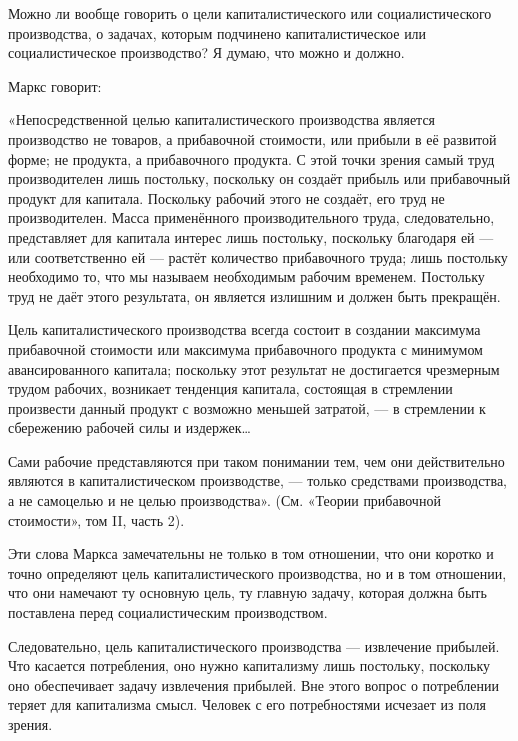 \documentclass[12pt, a4paper, openany]{book}
\begin{document}
Можно ли вообще говорить о цели капиталистического или социалистического производства, о задачах, которым подчинено капиталистическое или социалистическое производство? Я думаю, что можно и должно.



Маркс говорит:



«Непосредственной целью капиталистического производства является производство не товаров, а прибавочной стоимости, или прибыли в её развитой форме; не продукта, а прибавочного продукта. С этой точки зрения самый труд производителен лишь постольку, поскольку он создаёт прибыль или прибавочный продукт для капитала. Поскольку рабочий этого не создаёт, его труд не производителен. Масса применённого производительного труда, следовательно, представляет для капитала интерес лишь постольку, поскольку благодаря ей — или соответственно ей — растёт количество прибавочного труда; лишь постольку необходимо то, что мы называем необходимым рабочим временем. Постольку труд не даёт этого результата, он является излишним и должен быть прекращён.



Цель капиталистического производства всегда состоит в создании максимума прибавочной стоимости или максимума прибавочного продукта с минимумом авансированного капитала; поскольку этот результат не достигается чрезмерным трудом рабочих, возникает тенденция капитала, состоящая в стремлении произвести данный продукт с возможно меньшей затратой, — в стремлении к сбережению рабочей силы и издержек…



Сами рабочие представляются при таком понимании тем, чем они действительно являются в капиталистическом производстве, — только средствами производства, а не самоцелью и не целью производства». (См. «Теории прибавочной стоимости», том II, часть 2).



Эти слова Маркса замечательны не только в том отношении, что они коротко и точно определяют цель капиталистического производства, но и в том отношении, что они намечают ту основную цель, ту главную задачу, которая должна быть поставлена перед социалистическим производством.



Следовательно, цель капиталистического производства — извлечение прибылей. Что касается потребления, оно нужно капитализму лишь постольку, поскольку оно обеспечивает задачу извлечения прибылей. Вне этого вопрос о потреблении теряет для капитализма смысл. Человек с его потребностями исчезает из поля зрения.
\end{document}
